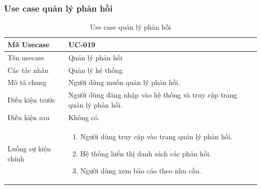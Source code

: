 \documentclass[12pt,a4paper]{article}
\begin{document}
\begin{table}[H]
    \end{table}


    \subsubsection*{Use case quản lý phản hồi}
    \begin{table}[H]
        \centering
        \begin{tabular}{|p{3.5cm}|p{11.5cm}|c|}
            \hline
            Mã Usecase      & UC-019                                                                \\
            \hline
            Tên usecase     & Quản lý phản hồi                                                      \\
            \hline
            Các tác nhân    & Quản lý hệ thống                                                      \\
            \hline
            Mô tả chung     & Người dùng muốn quản lý phản hồi.                                     \\
            \hline

            Điều kiện trước & Người dùng đăng nhập vào hệ thống và truy cập trang quản lý phản hồi. \\
            \hline

            Điều kiện sau   & Không có.                                                             \\
            \hline

            Luồng sự kiện chính & \vspace{-.8cm}\begin{enumerate}
                                                    \item Người dùng truy cập vào trang quản lý phản hồi.
                                                    \item Hệ thống hiển thị danh sách các phản hồi.
                                                    \item Người dùng xem báo cáo theo nhu cầu.
            \end{enumerate}
            \\
            \hline
        \end{tabular}
        \caption{Use case quản lý phản hồi}

    \end{table}


\end{document}

